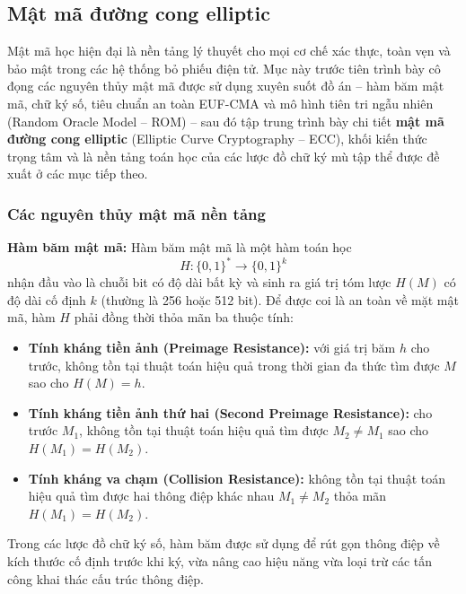 \subsection{Mật mã đường cong elliptic}
\label{sec:mat-ma-duong-cong-elliptic}

Mật mã học hiện đại là nền tảng lý thuyết cho mọi cơ chế xác thực, toàn vẹn và bảo mật trong các hệ thống bỏ phiếu điện tử. Mục này trước tiên trình bày cô đọng các nguyên thủy mật mã được sử dụng xuyên suốt đồ án -- hàm băm mật mã, chữ ký số, tiêu chuẩn an toàn EUF-CMA và mô hình tiên tri ngẫu nhiên (Random Oracle Model -- ROM) -- sau đó tập trung trình bày chi tiết \textbf{mật mã đường cong elliptic} (Elliptic Curve Cryptography -- ECC), khối kiến thức trọng tâm và là nền tảng toán học của các lược đồ chữ ký mù tập thể được đề xuất ở các mục tiếp theo.

\subsubsection{Các nguyên thủy mật mã nền tảng}

\textbf{Hàm băm mật mã:} Hàm băm mật mã là một hàm toán học
\begin{equation}
H: \{0,1\}^{*} \rightarrow \{0,1\}^{k}
\label{eq:hash-def}
\end{equation}
nhận đầu vào là chuỗi bit có độ dài bất kỳ và sinh ra giá trị tóm lược $H(M)$ có độ dài cố định $k$ (thường là 256 hoặc 512 bit). Để được coi là an toàn về mặt mật mã, hàm $H$ phải đồng thời thỏa mãn ba thuộc tính:

\begin{itemize}
    \item \textbf{Tính kháng tiền ảnh (Preimage Resistance):} với giá trị băm $h$ cho trước, không tồn tại thuật toán hiệu quả trong thời gian đa thức tìm được $M$ sao cho $H(M) = h$.

    \item \textbf{Tính kháng tiền ảnh thứ hai (Second Preimage Resistance):} cho trước $M_1$, không tồn tại thuật toán hiệu quả tìm được $M_2 \neq M_1$ sao cho $H(M_1) = H(M_2)$.

    \item \textbf{Tính kháng va chạm (Collision Resistance):} không tồn tại thuật toán hiệu quả tìm được hai thông điệp khác nhau $M_1 \neq M_2$ thỏa mãn $H(M_1) = H(M_2)$.
\end{itemize}

Trong các lược đồ chữ ký số, hàm băm được sử dụng để rút gọn thông điệp về kích thước cố định trước khi ký, vừa nâng cao hiệu năng vừa loại trừ các tấn công khai thác cấu trúc thông điệp.

